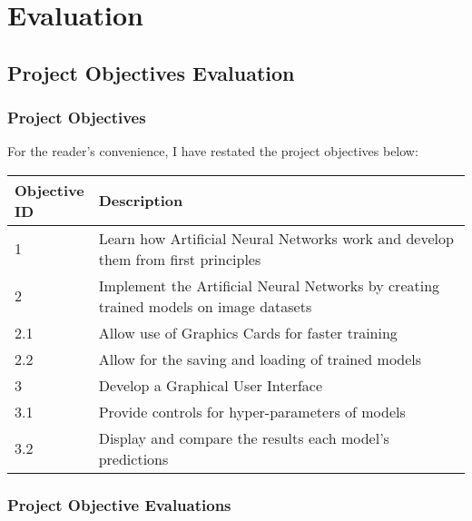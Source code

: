 \documentclass[./project-report/src/latex/project-report.tex]{subfiles}
\begin{document}
\maketitle

\clearpage
\section{Evaluation}

\subsection{Project Objectives Evaluation}

\subsubsection{Project Objectives}

For the reader's convenience, I have restated the project objectives below:
\vspace{5mm}

\noindent\begin{tabular}{|p{0.13\linewidth}|p{0.87\linewidth}|}
    \hline
    \textbf{Objective ID} & \textbf{Description} \\
    \hline
    1 & Learn how Artificial Neural Networks work and develop them from first principles \\
    \hline
    2 & Implement the Artificial Neural Networks by creating trained models on image datasets \\
    \hline
    2.1 & Allow use of Graphics Cards for faster training \\
    \hline
    2.2 & Allow for the saving and loading of trained models \\
    \hline
    3 & Develop a Graphical User Interface \\
    \hline
    3.1 & Provide controls for hyper-parameters of models \\
    \hline
    3.2 & Display and compare the results each model's predictions \\
    \hline
\end{tabular}

\subsubsection{Project Objective Evaluations}
\end{document}
